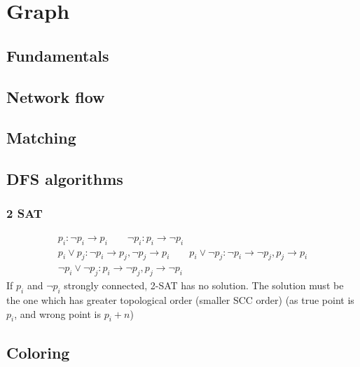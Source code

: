 \chapter{Graph}

\section{Fundamentals}

\section{Network flow}

\section{Matching}
	
\section{DFS algorithms}
	\subsection{2 SAT}
	\begin{align*}
		p_i: \neg p_i \to p_i \qquad \neg p_i : p_i \to \neg p_i \\
		p_i \lor p_j: \neg p_i \to p_j, \neg p_j \to p_i \qquad p_i \lor \neg p_j: \neg p_i \to \neg p_j, p_j \to p_i \\
		\neg p_i \lor \neg p_j: p_i \to \neg p_j, p_j \to \neg p_i
	\end{align*}
	If $p_i$ and $\neg p_i$ strongly connected, 2-SAT has no solution. The solution must be the one which has greater topological order (smaller SCC order) (as true point is $p_i$, and wrong point is $p_i + n$)
\section{Coloring}

